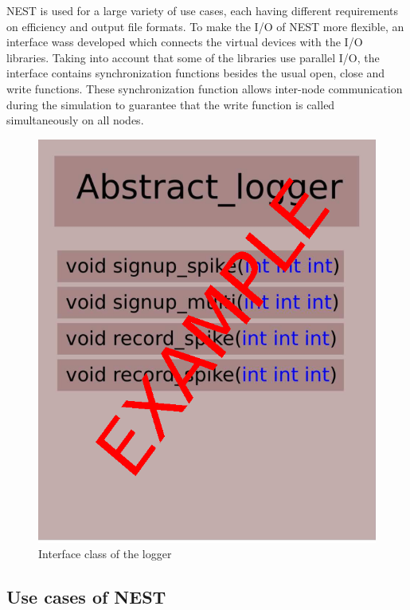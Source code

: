 \documentclass[]{YIC2015}
\begin{document}
NEST is used for a large variety of use cases, each having different
requirements on efficiency and output file formats. To make the I/O of
NEST more flexible, an interface wass developed which connects the
virtual devices with the I/O libraries. Taking into account that some
of the libraries use parallel I/O, the interface contains
synchronization functions besides the usual open, close and write
functions. These synchronization function allows inter-node
communication during the simulation to guarantee that the write
function is called simultaneously on all nodes.

\begin{figure}[htbp]
\centering %
\includegraphics[scale=0.5]{loggerinterface.eps}
\caption{Interface class of the logger}
\label{fig:loggerinterface}
\end{figure}

\subsection{Use cases of NEST}
\end{document}
